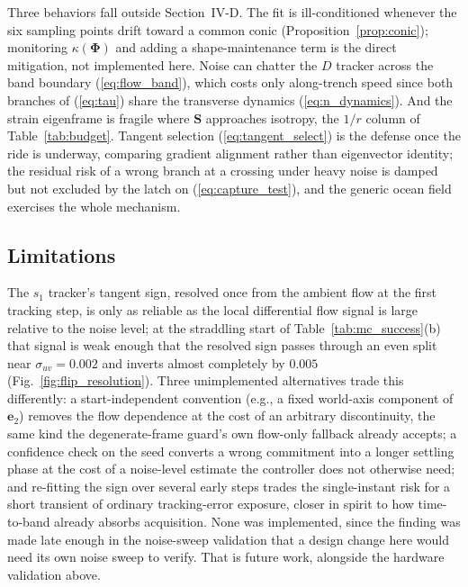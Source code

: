 \documentclass[lettersize,journal]{IEEEtran}
\begin{document}
Three behaviors fall outside Section~\mbox{IV-D}. The fit is
ill-conditioned whenever the six sampling points drift toward a common
conic (Proposition~\ref{prop:conic}); monitoring
$\kappa(\boldsymbol{\Phi})$ and adding a shape-maintenance term is the
direct mitigation, not implemented here. Noise can chatter the $D$
tracker across
the band boundary (\ref{eq:flow_band}), which costs only along-trench
speed since both branches of (\ref{eq:tau}) share the transverse
dynamics (\ref{eq:n_dynamics}). And the strain eigenframe is fragile
where $\mathbf{S}$ approaches isotropy, the $1/r$ column of
Table~\ref{tab:budget}. Tangent selection (\ref{eq:tangent_select}) is
the defense once the ride is underway, comparing gradient alignment
rather than eigenvector identity; the residual risk of a wrong branch at
a crossing under heavy noise is damped but not excluded by the latch on
(\ref{eq:capture_test}), and the generic ocean field exercises the whole
mechanism.

\subsection{Limitations}
\label{sec:limitations}

The $s_1$ tracker's tangent sign, resolved once from the ambient flow
at the first tracking step, is only
as reliable as the local differential flow signal is large relative to
the noise level; at the straddling start of Table~\ref{tab:mc_success}(b)
that signal is weak enough that the resolved sign passes through an even
split near $\sigma_{uv} = 0.002$ and inverts almost completely by
$0.005$ (Fig.~\ref{fig:flip_resolution}). Three
unimplemented alternatives trade this differently: a start-independent
convention (e.g., a fixed world-axis component of $\mathbf{e}_2$)
removes the flow dependence at the cost of an arbitrary discontinuity,
the same kind the degenerate-frame guard's own flow-only fallback
already accepts; a
confidence check on the seed converts a wrong commitment into a longer
settling phase at the cost of a noise-level estimate the controller does
not otherwise need; and re-fitting the sign over several early steps
trades the single-instant risk for a short transient of ordinary
tracking-error exposure, closer in spirit to how time-to-band already
absorbs acquisition. None was implemented, since the finding was made
late enough in the noise-sweep validation that a design change here
would need its own noise sweep to verify. That is future work, alongside
the hardware validation above.
\end{document}
